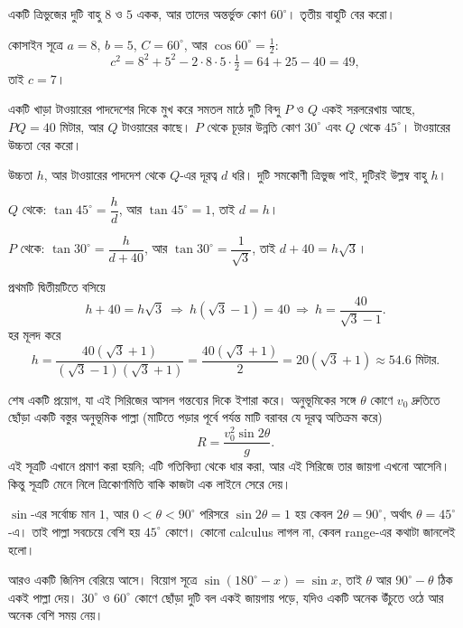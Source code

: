 \documentclass[11pt]{article}
\begin{document}
\begin{example}
একটি ত্রিভুজের দুটি বাহু $8$ ও $5$ একক, আর তাদের অন্তর্ভুক্ত কোণ $60^\circ$।
তৃতীয় বাহুটি বের করো।
\end{example}

\begin{solbox}
কোসাইন সূত্রে $a = 8$, $b = 5$, $C = 60^\circ$, আর $\cos 60^\circ = \tfrac{1}{2}$:
\[
  c^2 = 8^2 + 5^2 - 2 \cdot 8 \cdot 5 \cdot \tfrac{1}{2}
      = 64 + 25 - 40 = 49 ,
\]
তাই $c = 7$।
\end{solbox}

\begin{example}
একটি খাড়া টাওয়ারের পাদদেশের দিকে মুখ করে সমতল মাঠে দুটি বিন্দু $P$ ও $Q$ একই
সরলরেখায় আছে, $PQ = 40$ মিটার, আর $Q$ টাওয়ারের কাছে। $P$ থেকে চূড়ার উন্নতি কোণ
$30^\circ$ এবং $Q$ থেকে $45^\circ$। টাওয়ারের উচ্চতা বের করো।
\end{example}

\begin{solbox}
উচ্চতা $h$, আর টাওয়ারের পাদদেশ থেকে $Q$-এর দূরত্ব $d$ ধরি। দুটি সমকোণী ত্রিভুজ
পাই, দুটিরই উল্লম্ব বাহু $h$।

$Q$ থেকে: $\tan 45^\circ = \dfrac{h}{d}$, আর $\tan 45^\circ = 1$, তাই $d = h$।

$P$ থেকে: $\tan 30^\circ = \dfrac{h}{d + 40}$, আর
$\tan 30^\circ = \dfrac{1}{\sqrt{3}}$, তাই $d + 40 = h\sqrt{3}$।

প্রথমটি দ্বিতীয়টিতে বসিয়ে
\[
  h + 40 = h\sqrt{3}
  \ \Longrightarrow\ h(\sqrt{3} - 1) = 40
  \ \Longrightarrow\ h = \frac{40}{\sqrt{3}-1} .
\]
হর মূলদ করে
\[
  h = \frac{40(\sqrt{3}+1)}{(\sqrt{3}-1)(\sqrt{3}+1)} = \frac{40(\sqrt{3}+1)}{2}
    = 20(\sqrt{3}+1) \approx 54.6 \text{ মিটার} .
\]
\end{solbox}

\begin{remark}
শেষ একটি প্রয়োগ, যা এই সিরিজের আসল গন্তব্যের দিকে ইশারা করে। অনুভূমিকের সঙ্গে
$\theta$ কোণে $v_0$ দ্রুতিতে ছোঁড়া একটি বস্তুর অনুভূমিক পাল্লা (মাটিতে পড়ার পূর্বে পর্যন্ত মাটি বরাবর যে দূরত্ব অতিক্রম করে)
\[
  R = \frac{v_0^2 \sin 2\theta}{g} .
\]
এই সূত্রটি এখানে প্রমাণ করা হয়নি; এটি গতিবিদ্যা থেকে ধার করা, আর এই সিরিজে
তার জায়গা এখনো আসেনি। কিন্তু সূত্রটি মেনে নিলে ত্রিকোণমিতি বাকি কাজটা এক
লাইনে সেরে দেয়।

$\sin$-এর সর্বোচ্চ মান $1$, আর $0 < \theta < 90^\circ$ পরিসরে $\sin 2\theta = 1$
হয় কেবল $2\theta = 90^\circ$, অর্থাৎ $\theta = 45^\circ$-এ। তাই পাল্লা সবচেয়ে
বেশি হয় $45^\circ$ কোণে। কোনো calculus লাগল না, কেবল range-এর কথাটা জানলেই হলো।

আরও একটি জিনিস বেরিয়ে আসে। বিয়োগ সূত্রে $\sin(180^\circ - x) = \sin x$, তাই
$\theta$ আর $90^\circ - \theta$ ঠিক একই পাল্লা দেয়। $30^\circ$ ও $60^\circ$
কোণে ছোঁড়া দুটি বল একই জায়গায় পড়ে, যদিও একটি অনেক উঁচুতে ওঠে আর অনেক বেশি
সময় নেয়।
\end{remark}
\end{document}
